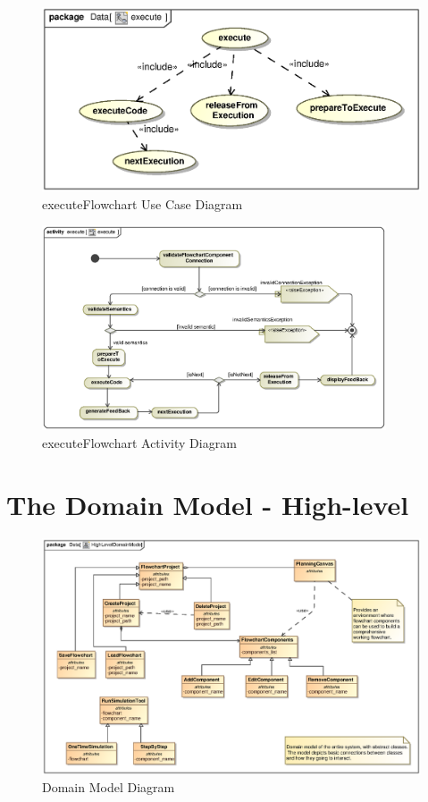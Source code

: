 \documentclass[12pt,a4paper,titlepage]{article}
\begin{document}
\begin{figure}[H]
  \centering
\includegraphics[width=500px]{execute.eps}
\caption{executeFlowchart Use Case Diagram}
\end{figure}

\begin{figure}[H]
  \centering
\includegraphics[width=385px]{executeAct.eps}
\caption{executeFlowchart Activity Diagram}
\end{figure}

\newpage
\section{The Domain Model - High-level}
\begin{figure}[H]
  \centering
\includegraphics[width=500px]{HighLevelDomainModel.eps}
\caption{Domain Model Diagram}
\end{figure}

\newpage

\end{document}
